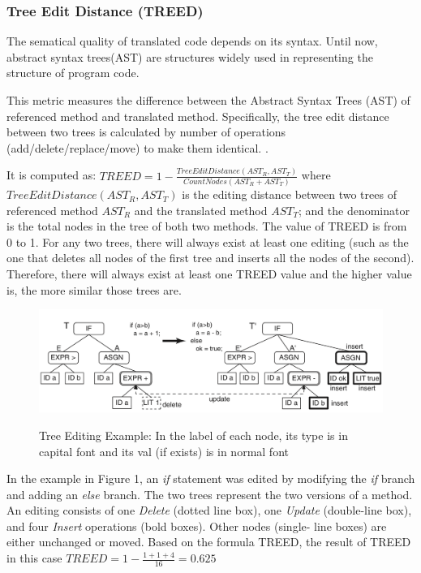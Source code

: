 \subsubsection{\textbf{Tree Edit Distance (TREED)}}  
The sematical quality of translated code depends on its syntax. Until now, abstract syntax trees(AST) are structures widely used in  representing the structure of program code. 

This metric measures the difference between the Abstract Syntax Trees (AST) of referenced method and translated method. Specifically, the tree edit distance between two trees is calculated by number of operations (add/delete/replace/move) to make them identical. \cite{algorithm}. 

It is computed as:  $TREED = 1 -  \frac{TreeEditDistance\left(AST_R, AST_T\right)}{CountNodes \left(AST_R+AST_T\right)}$ where $TreeEditDistance\left(AST_R, AST_T\right)$ is the editing distance between two trees of referenced method $AST_R$ and the translated method $AST_T$; and the denominator is the total nodes in the tree of both two methods. The value of TREED is from 0 to 1. For any two trees, there will always exist at least one editing (such as the one that deletes all nodes of the first tree and inserts all the nodes of the second). Therefore, there will always exist at least one TREED value and the higher value is, the more similar those trees are.

\begin{figure}[h]
	\caption{Tree Editing Example: In the label of each node, its type is in capital font and its val (if exists) is in normal font}
	\includegraphics[scale=0.3]{img/treed.png}
	\centering
	\label{fig:treed}
\end{figure}

In the example in Figure 1, an \textit{if} statement was edited by modifying the \textit{if} branch and adding an \textit{else} branch. The two trees represent the two versions of a method. An editing consists of one \textit{Delete} (dotted line box), one \textit{Update} (double-line box), and four \textit{Insert} operations (bold boxes). Other nodes (single- line boxes) are either unchanged or moved. Based on the formula TREED, the result of TREED in this case  $TREED = 1 - \frac{1 + 1 + 4}{16}=0.625$



